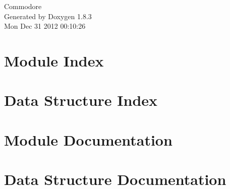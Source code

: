 \documentclass{book}
\begin{document}
\hypersetup{pageanchor=false,citecolor=blue}
\begin{titlepage}
\vspace*{7cm}
\begin{center}
{\Large Commodore }\\
\vspace*{1cm}
{\large Generated by Doxygen 1.8.3}\\
\vspace*{0.5cm}
{\small Mon Dec 31 2012 00:10:26}\\
\end{center}
\end{titlepage}
\clearemptydoublepage
{}
\tableofcontents
\clearemptydoublepage
{}
\hypersetup{pageanchor=true,citecolor=blue}
\chapter{Module Index}

\chapter{Data Structure Index}

\chapter{Module Documentation}











\chapter{Data Structure Documentation}







\printindex
\end{document}
